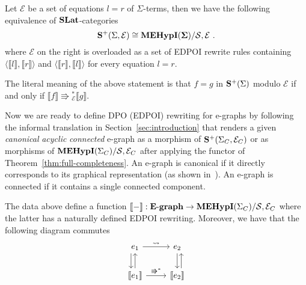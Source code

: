 
\begin{theorem}
\label{thm:full-completeness}
Let $\mathcal{E}$ be a set of equations $l = r$ of $\Sigma$-terms, then we have the following equivalence of $\mathbf{SLat}$-categories
\vspace{-2mm}
\[
	\catname{S}^{+}(\Sigma, \mathcal {E} ) \cong \WellTypedMdaEcospans / \mathcal{S,E}~.
\vspace{-1mm}
\]
where $\mathcal{E}$ on the right is overloaded as a set of EDPOI rewrite rules containing $\langle \llbracket l \rrbracket, \llbracket r \rrbracket  \rangle$ and $\langle \llbracket r \rrbracket, \llbracket l \rrbracket  \rangle$ for every equation $l = r$.
\end{theorem}

The literal meaning of the above statement is that $f = g$ in $\mathbf{S}^{+}(\Sigma)$ modulo $\mathcal{E}$ if and only if $\llbracket f \rrbracket \Rrightarrow{}^{*}_{\mathcal{E}} \llbracket g \rrbracket$.

Now we are ready to define DPO (EDPOI) rewriting for e-graphs by following the informal translation in Section~\ref{sec:introduction} that renders a given \textit{canonical} \textit{acyclic} \textit{connected} e-graph as a morphism of $\mathbf{S}^{+}(\Sigma_{C}, \mathcal{E}_{C})$ or as morphisms of $\mathbf{MEHypI}(\Sigma_{C}) / \mathcal{S}, \mathcal{E}_{C}$  after applying the functor of Theorem~\ref{thm:full-completeness}.
An e-graph is canonical if it directly corresponds to its graphical representation (as shown in~).
An e-graph is connected if it contains a single connected component.
\begin{proposition}
The data above define a function $\llbracket - \rrbracket : \mathbf{E}\text{-}\mathbf{graph} \to \mathbf{MEHypI}(\Sigma_{C}) / \mathcal{S}, \mathcal{E}_{C}$ where the latter has a naturally defined EDPOI rewriting.
Moreover, we have that the following diagram commutes
\[
\begin{tikzcd}
		e_1 \arrow[r, "\leadsto"] \arrow[d, shift right=2]                & e_2 \arrow[d]                                        \\
		\llbracket e_1 \rrbracket \arrow[r, "\Rrightarrow^{*}"] \arrow[u] & \llbracket e_{2} \rrbracket \arrow[u, shift right=2]
\end{tikzcd}
\]
\end{proposition}

